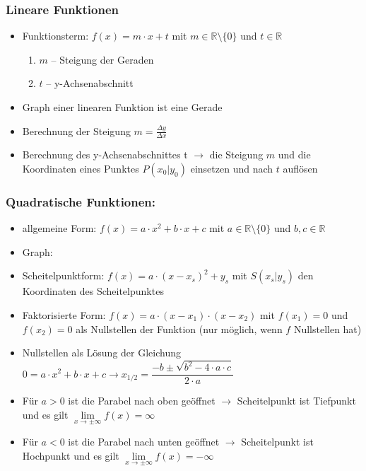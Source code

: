 \subsubsection{Lineare Funktionen} 
\begin{itemize}
\item Funktionsterm: $f(x) = m\cdot x +t$ mit $m\in \mathds{R}\setminus\{0\}$ und $t\in \mathds{R}$ 
  \begin{enumerate}
  \item $m$ – Steigung der Geraden
  \item $t$ – y-Achsenabschnitt
  \end{enumerate}
  \item Graph einer linearen Funktion ist eine Gerade 
  \item Berechnung der Steigung $ m=\frac{\Delta y}{\Delta x}$
  \item Berechnung des y-Achsenabschnittes t $\longrightarrow$ die Steigung $m$ und die Koordinaten eines Punktes $P(x_0|y_0)$ einsetzen und nach $t$ auflösen
\end{itemize}
\subsubsection{Quadratische Funktionen:}
\begin{itemize}
\item allgemeine Form: $f(x) = a\cdot x^2 + b\cdot x +c$ mit $a\in \mathds{R}\setminus \{0\}$ und $b, c \in \mathds{R}$
\item Graph: 
\item Scheitelpunktform: $f(x) = a\cdot(x-x_s)^2 +y_s$ mit $S(x_s|y_s)$ den Koordinaten des Scheitelpunktes
\item Faktorisierte Form: $f(x)= a\cdot (x-x_1)\cdot (x-x_2)$ mit $f(x_1)= 0$ und $f(x_2)= 0$ als Nullstellen der Funktion (nur möglich, wenn $f$ Nullstellen hat)
\item Nullstellen als Lösung der Gleichung\\ $0 =a\cdot x^2 + b\cdot x +c \longrightarrow x_{1/2} = \dfrac{-b\pm\sqrt{b^2-4\cdot a\cdot c}}{2\cdot a}$
\item Für $a>0$ ist die Parabel nach oben geöffnet $\longrightarrow$ Scheitelpunkt ist Tiefpunkt und es gilt $
\lim\limits_{x \to \pm\infty} f(x) = \infty$
\item Für $a<0$ ist die Parabel nach unten geöffnet $\longrightarrow$ Scheitelpunkt ist Hochpunkt und es gilt $
\lim\limits_{x \to \pm\infty} f(x) = -\infty$\\[0.15cm]
\end{itemize}
